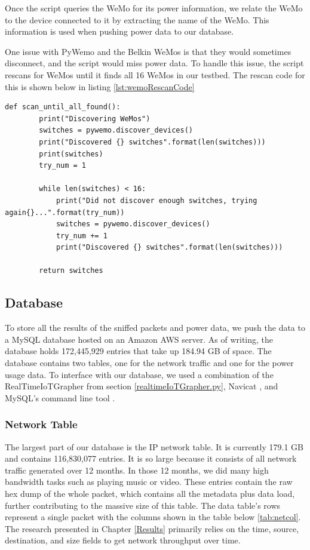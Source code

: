 Once the script queries the WeMo for its power information, we relate the WeMo to the device connected to it by extracting the name of the WeMo. This information is used when pushing power data to our database.

One issue with PyWemo and the Belkin WeMos is that they would sometimes disconnect, and the script would miss power data. To handle this issue, the script rescans for WeMos until it finds all 16 WeMos in our testbed. The rescan code for this is shown below in listing \ref{lst:wemoRescanCode}

\noindent
\begin{minipage}{\textwidth}
\begin{lstlisting}[label={lst:wemoRescanCode},caption={Rescan if all WeMos not found.}]
    def scan_until_all_found():
        print("Discovering WeMos")
        switches = pywemo.discover_devices()
        print("Discovered {} switches".format(len(switches)))
        print(switches)
        try_num = 1

        while len(switches) < 16:
            print("Did not discover enough switches, trying again{}...".format(try_num))
            switches = pywemo.discover_devices()
            try_num += 1
            print("Discovered {} switches".format(len(switches)))

        return switches
\end{lstlisting}
\end{minipage}

\subsection{Database}
\label{Database}

To store all the results of the sniffed packets and power data, we push the data to a MySQL database hosted on an Amazon AWS server. As of writing, the database holds 172,445,929 entries that take up 184.94 GB of space. The database contains two tables, one for the network traffic and one for the power usage data. To interface with our database, we used a combination of the RealTimeIoTGrapher from section \ref{realtimeIoTGrapher.py}, Navicat \cite{navicat}, and MySQL’s command line tool \cite{mysqlCommandline}.

\subsubsection{Network Table}
\label{Network Table}
The largest part of our database is the IP network table. It is currently 179.1 GB and contains 116,830,077 entries. It is so large because it consists of all network traffic generated over 12 months. In those 12 months, we did many high bandwidth tasks such as playing music or video. These entries contain the raw hex dump of the whole packet, which contains all the metadata plus data load, further contributing to the massive size of this table. The data table's rows represent a single packet with the columns shown in the table below \ref{tab:netcol}. The research presented in Chapter \ref{Results} primarily relies on the time, source, destination, and size fields to get network throughput over time.

